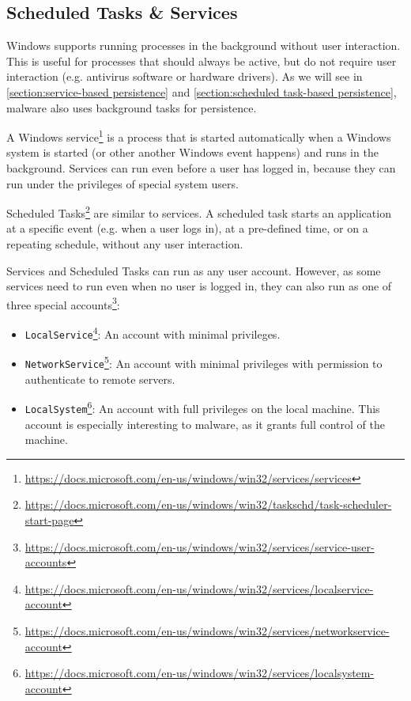 \subsection{Scheduled Tasks \& Services}\label{section:scheduled tasks services in windows}
Windows supports running processes in the background without user interaction. This is useful for processes that should always be active, but do not require user interaction (e.g. antivirus software or hardware drivers). As we will see in \autoref{section:service-based persistence} and \autoref{section:scheduled task-based persistence}, malware also uses background tasks for persistence.

A Windows service\footnote{\tiny \url{https://docs.microsoft.com/en-us/windows/win32/services/services}} is a process that is started automatically when a Windows system is started (or other another Windows event happens) and runs in the background. Services can run even before a user has logged in, because they can run under the privileges of special system users.

Scheduled Tasks\footnote{\tiny \url{https://docs.microsoft.com/en-us/windows/win32/taskschd/task-scheduler-start-page}} are similar to services. A scheduled task starts an application at a specific event (e.g. when a user logs in), at a pre-defined time, or on a repeating schedule, without any user interaction.

Services and Scheduled Tasks can run as any user account. However, as some services need to run even when no user is logged in, they can also run as one of three special accounts\footnote{\tiny \url{https://docs.microsoft.com/en-us/windows/win32/services/service-user-accounts}}:
\begin{itemize}
    \item \texttt{LocalService}\footnote{\tiny \url{https://docs.microsoft.com/en-us/windows/win32/services/localservice-account}}: An account with minimal privileges.

    \item \texttt{NetworkService}\footnote{\tiny \url{https://docs.microsoft.com/en-us/windows/win32/services/networkservice-account}}: An account with minimal privileges with permission to authenticate to remote servers.

    \item \texttt{LocalSystem}\footnote{\tiny \url{https://docs.microsoft.com/en-us/windows/win32/services/localsystem-account}}: An account with full privileges on the local machine. This account is especially interesting to malware, as it grants full control of the machine.
\end{itemize}

